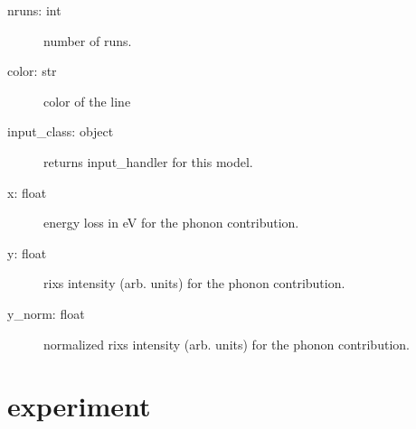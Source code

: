 \documentclass[letterpaper,10pt,english]{sphinxmanual}
\begin{document}
\begin{fulllineitems}
\begin{description}
\begin{description}
\item[{nruns: int}] \leavevmode
number of runs.

\item[{color: str}] \leavevmode
color of the line

\item[{input\_class: object}] \leavevmode
returns input\_handler for this model.

\item[{x: float}] \leavevmode
energy loss in eV for the phonon contribution.

\item[{y: float}] \leavevmode
rixs intensity (arb. units) for the phonon contribution.

\item[{y\_norm: float}] \leavevmode
normalized rixs intensity (arb. units) for the phonon contribution.

\end{description}

\end{description}

\end{fulllineitems}



\section{experiment}
\label{\detokenize{modules/experiment:module-phlab.experiment}}\label{\detokenize{modules/experiment:experiment}}\label{\detokenize{modules/experiment::doc}}
\end{document}
